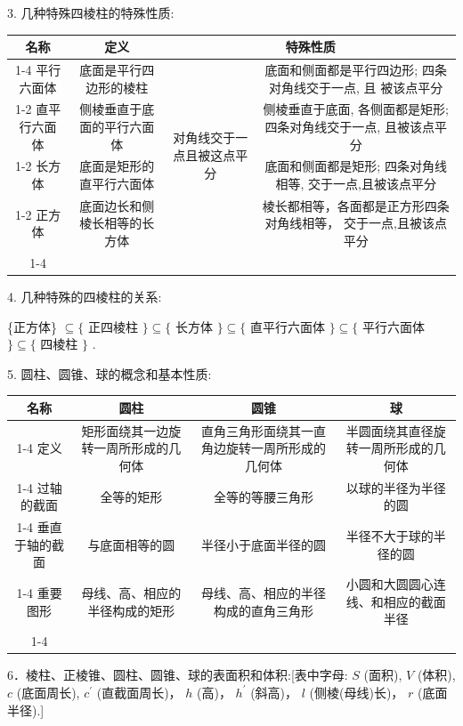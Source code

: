 3. 几种特殊四棱柱的特殊性质:

\begin{center}
\begin{tabular}{|c|c|c|c|}
\hline
名称 & 定义 & \multicolumn{2}{|c|}{特殊性质} \\
\cline{1-4}
平行六面体 & 底面是平行四边形的棱柱 & \multirow{4}{*}{对角线交于一点且被这点平分} & 底面和侧面都是平行四边形; 四条对角线交于一点, 且 被该点平分 \\
\cline{1-2}
\cline{4-4}
直平行六面体 & 侧棱垂直于底面的平行六面体 &  & 侧棱垂直于底面, 各侧面都是矩形; 四条对角线交于一点, 且被该点平分 \\
\cline{1-2}
\cline{4-4}
长方体 & 底面是矩形的直平行六面体 &  & 底面和侧面都是矩形; 四条对角线相等, 交于一点,且被该点平分 \\
\cline{1-2}
\cline{4-4}
正方体 & 底面边长和侧棱长相等的长方体 &  & 棱长都相等，各面都是正方形四条对角线相等， 交于一点,且被该点平分 \\
\cline{1-4}
\hline
\end{tabular}
\end{center}

4. 几种特殊的四棱柱的关系:

\{正方体\} $\subseteq  \{$ 正四棱柱 $\}  \subseteq  \{$ 长方体 $\}  \subseteq  \{$ 直平行六面体 $\}  \subseteq  \{$ 平行六面体 $\}  \subseteq  \{$ 四棱柱 $\}$ .

5. 圆柱、圆锥、球的概念和基本性质:

\begin{center}
\begin{tabular}{|c|c|c|c|}
\hline
名称 & 圆柱 & 圆锥 & 球 \\
\cline{1-4}
定义 & 矩形面绕其一边旋转一周所形成的几何体 & 直角三角形面绕其一直角边旋转一周所形成的几何体 & 半圆面绕其直径旋转一周所形成的几何体 \\
\cline{1-4}
过轴的截面 & 全等的矩形 & 全等的等腰三角形 & 以球的半径为半径的圆 \\
\cline{1-4}
垂直于轴的截面 & 与底面相等的圆 & 半径小于底面半径的圆 & 半径不大于球的半径的圆 \\
\cline{1-4}
重要图形 & 母线、高、相应的半径构成的矩形 & 母线、高、相应的半径构成的直角三角形 & 小圆和大圆圆心连线、和相应的截面半径 \\
\cline{1-4}
\hline
\end{tabular}
\end{center}

6．棱柱、正棱锥、圆柱、圆锥、球的表面积和体积:[表中字母: $S$ (面积), $V$ (体积), $c$ (底面周长), ${c}^{\prime }$ (直截面周长)， $h$ (高)， ${h}^{\prime }$ (斜高)， $l$ (侧棱(母线)长)， $r$ (底面半径).]

